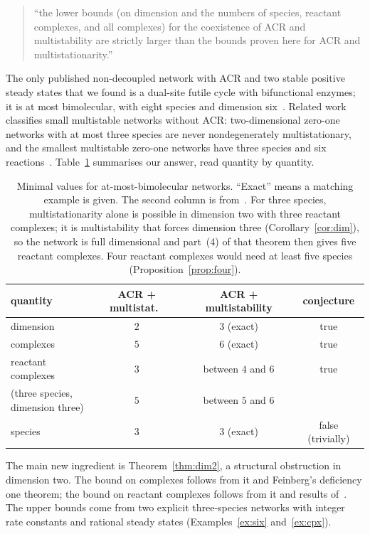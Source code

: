 \documentclass[11pt]{amsart}
\theoremstyle{definition}
\theoremstyle{remark}
\begin{document}
\begin{quote}
``the lower bounds (on dimension and the numbers of species, reactant complexes, and all complexes) for the coexistence of ACR and multistability are strictly larger than the bounds proven here for ACR and multistationarity.''
\end{quote}

The only published non-decoupled network with ACR and two stable positive steady states that we found is a dual-site futile cycle with bifunctional enzymes; it is at most bimolecular, with eight species and dimension six~\cite{jnj2026}. Related work classifies small multistable networks without ACR: two-dimensional zero-one networks with at most three species are never nondegenerately multistationary, and the smallest multistable zero-one networks have three species and six reactions~\cite{jtz2024,tangZhang2026}. Table~\ref{tab:summary} summarises our answer, read quantity by quantity.

\begin{table}[ht]
\centering
\begin{tabular}{lccc}
\toprule
quantity & ACR + multistat.~\cite{kns2024} & ACR + multistability & conjecture \\
\midrule
dimension & $2$ & $3$ (exact) & true \\
complexes & $5$ & $6$ (exact) & true \\
reactant complexes & $3$ & between $4$ and $6$ & true \\
\shortstack[l]{\quad (three species,\\\quad dimension three)} & $5$ & between $5$ and $6$ & \\
species & $3$ & $3$ (exact) & false (trivially) \\
\bottomrule
\end{tabular}
\caption{Minimal values for at-most-bimolecular networks. ``Exact'' means a matching example is given. The second column is from~\cite[Theorem~1.2]{kns2024}. For three species, multistationarity alone is possible in dimension two with three reactant complexes; it is multistability that forces dimension three (Corollary~\ref{cor:dim}), so the network is full dimensional and part~(4) of that theorem then gives five reactant complexes. Four reactant complexes would need at least five species (Proposition~\ref{prop:four}).}
\label{tab:summary}
\end{table}

The main new ingredient is Theorem~\ref{thm:dim2}, a structural obstruction in dimension two. The bound on complexes follows from it and Feinberg's deficiency one theorem; the bound on reactant complexes follows from it and results of~\cite{kns2024}. The upper bounds come from two explicit three-species networks with integer rate constants and rational steady states (Examples~\ref{ex:six} and~\ref{ex:cpx}).
\end{document}
